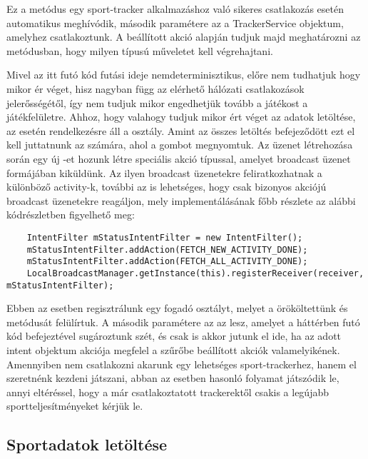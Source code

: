 Ez a metódus egy sport-tracker alkalmazáshoz való sikeres csatlakozás esetén automatikus meghívódik, második paramétere az a TrackerService objektum, amelyhez csatlakoztunk. 
A beállított akció alapján tudjuk majd meghatározni az  metódusban, hogy milyen típusú műveletet kell végrehajtani. 

Mivel az itt futó kód futási ideje nemdeterminisztikus, előre nem tudhatjuk hogy mikor ér véget, hisz nagyban függ az elérhető hálózati csatlakozások jelerősségétől, így nem tudjuk mikor engedhetjük tovább a játékost a játékfelületre. 
Ahhoz, hogy valahogy tudjuk mikor ért véget az adatok letöltése, az  esetén rendelkezésre áll a  osztály. 
Amint az összes letöltés befejeződött ezt el kell juttatnunk az  számára, ahol a gombot megnyomtuk. 
Az üzenet létrehozása során egy új -et hozunk létre speciális akció típussal, amelyet broadcast üzenet formájában kiküldünk. 
Az ilyen broadcast üzenetekre feliratkozhatnak a különböző activity-k, további az is lehetséges, hogy csak bizonyos akciójú broadcast üzenetekre reagáljon, mely implementálásának főbb részlete az alábbi kódrészletben figyelhető meg:

\begin{lstlisting}
    IntentFilter mStatusIntentFilter = new IntentFilter();
    mStatusIntentFilter.addAction(FETCH_NEW_ACTIVITY_DONE);
    mStatusIntentFilter.addAction(FETCH_ALL_ACTIVITY_DONE);
    LocalBroadcastManager.getInstance(this).registerReceiver(receiver, mStatusIntentFilter);
\end{lstlisting}

Ebben az esetben regisztrálunk egy fogadó osztályt, melyet a  örököltettünk és  metódusát felülírtuk. 
A második paramétere az az  lesz, amelyet a háttérben futó kód befejeztével sugároztunk szét, és csak is akkor jutunk el ide, ha az adott intent objektum akciója megfelel a szűrőbe beállított akciók valamelyikének. 
Amennyiben nem csatlakozni akarunk egy lehetséges sport-trackerhez, hanem el szeretnénk kezdeni játszani, abban az esetben hasonló folyamat játszódik le, annyi eltéréssel, hogy a már csatlakoztatott trackerektől csakis a legújabb sportteljesítményeket kérjük le. 

\subsection*{Sportadatok letöltése}
\label{trackerconnect}

